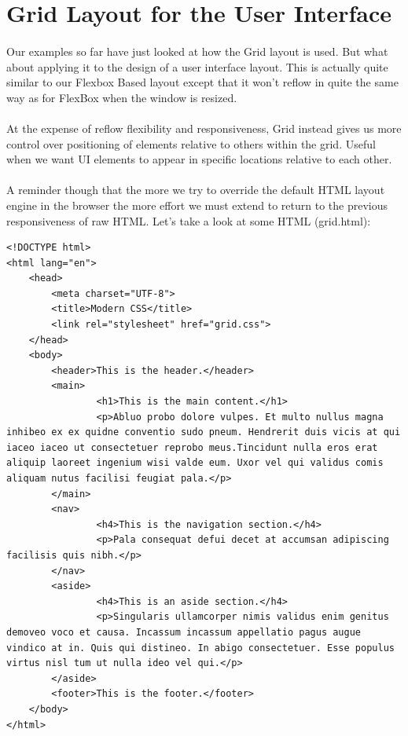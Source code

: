 \section{Grid Layout for the User Interface}
\paragraph{} Our examples so far have just looked at how the Grid layout is used. But what about applying it to the design of a user interface layout. This is actually quite similar to our Flexbox Based layout except that it won't reflow in quite the same way as for FlexBox when the window is resized.

\paragraph{} At the expense of reflow flexibility and responsiveness, Grid instead gives us more control over positioning of elements relative to others within the grid. Useful when we want UI elements to appear in specific locations relative to each other.

\paragraph{} A reminder though that the more we try to override the default HTML layout engine in the browser the more effort we must extend to return to the previous responsiveness of raw HTML. Let's take a look at some HTML (grid.html):


\begin{lstlisting}
<!DOCTYPE html>
<html lang="en">
	<head>
  		<meta charset="UTF-8">
  		<title>Modern CSS</title>
  		<link rel="stylesheet" href="grid.css">
	</head>
	<body>
  		<header>This is the header.</header>
  		<main>
    			<h1>This is the main content.</h1>
    			<p>Abluo probo dolore vulpes. Et multo nullus magna inhibeo ex ex quidne conventio sudo pneum. Hendrerit duis vicis at qui iaceo iaceo ut consectetuer reprobo meus.Tincidunt nulla eros erat aliquip laoreet ingenium wisi valde eum. Uxor vel qui validus comis aliquam nutus facilisi feugiat pala.</p>
		</main>
  		<nav>
    			<h4>This is the navigation section.</h4>
    			<p>Pala consequat defui decet at accumsan adipiscing facilisis quis nibh.</p>
  		</nav>
  		<aside>
    			<h4>This is an aside section.</h4>
    			<p>Singularis ullamcorper nimis validus enim genitus demoveo voco et causa. Incassum incassum appellatio pagus augue vindico at in. Quis qui distineo. In abigo consectetuer. Esse populus virtus nisl tum ut nulla ideo vel qui.</p>
  		</aside>
  		<footer>This is the footer.</footer>
	</body>
</html>
\end{lstlisting}


